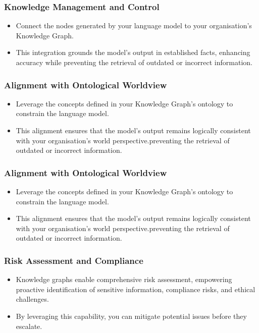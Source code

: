 \begin{frame}[fragile]\frametitle{Knowledge Management and Control}

\begin{itemize}
\item Connect the nodes generated by your language model to your organisation's Knowledge Graph. 
\item This integration grounds the model's output in established facts, enhancing accuracy while preventing the retrieval of outdated or incorrect information.
\end{itemize}
	  
\end{frame}

\begin{frame}[fragile]\frametitle{Alignment with Ontological Worldview}

\begin{itemize}
\item Leverage the concepts defined in your Knowledge Graph's ontology to constrain the language model. 
\item This alignment ensures that the model's output remains logically consistent with your organisation's world perspective.preventing the retrieval of outdated or incorrect information.
\end{itemize}
	  
\end{frame}

\begin{frame}[fragile]\frametitle{Alignment with Ontological Worldview}
\begin{itemize}
\item Leverage the concepts defined in your Knowledge Graph's ontology to constrain the language model. 
\item This alignment ensures that the model's output remains logically consistent with your organisation's world perspective.preventing the retrieval of outdated or incorrect information.
\end{itemize}
\end{frame}

\begin{frame}[fragile]\frametitle{Risk Assessment and Compliance}
\begin{itemize}
\item Knowledge graphs enable comprehensive risk assessment, empowering proactive identification of sensitive information, compliance risks, and ethical challenges. 
\item By leveraging this capability, you can mitigate potential issues before they escalate.
\end{itemize}
\end{frame}

